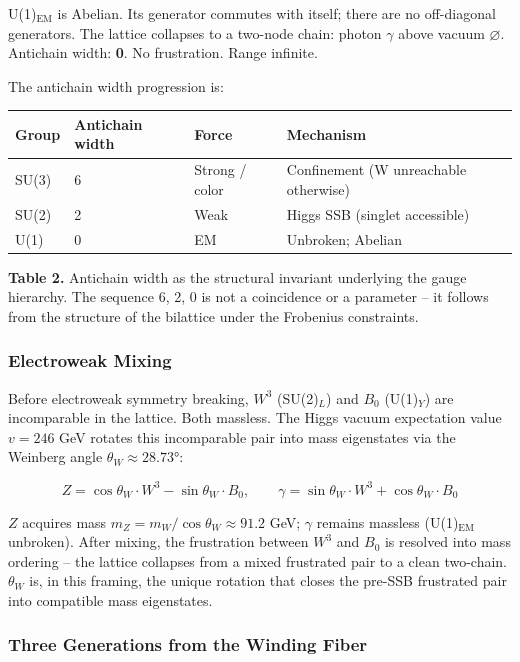 U(1)\(_\text{EM}\) is Abelian. Its generator commutes with itself; there
are no off-diagonal generators. The lattice collapses to a two-node
chain: photon \(\gamma\) above vacuum \(\varnothing\). Antichain width:
\textbf{0}. No frustration. Range infinite.

The antichain width progression is:

\begin{longtable}[]{@{}llll@{}}
\toprule
Group & Antichain width & Force & Mechanism\tabularnewline
\midrule
\endhead
SU(3) & 6 & Strong / color & Confinement (W unreachable
otherwise)\tabularnewline
SU(2) & 2 & Weak & Higgs SSB (singlet accessible)\tabularnewline
U(1) & 0 & EM & Unbroken; Abelian\tabularnewline
\bottomrule
\end{longtable}

\textbf{Table 2.} Antichain width as the structural invariant underlying
the gauge hierarchy. The sequence 6, 2, 0 is not a coincidence or a
parameter -- it follows from the structure of the bilattice under the
Frobenius constraints.

\hypertarget{electroweak-mixing}{%
\subsubsection{Electroweak Mixing}\label{electroweak-mixing}}

Before electroweak symmetry breaking, \(W^3\) (SU(2)\(_L\)) and \(B_0\)
(U(1)\(_Y\)) are incomparable in the lattice. Both massless. The Higgs
vacuum expectation value \(v = 246\) GeV rotates this incomparable pair
into mass eigenstates via the Weinberg angle
\(\theta_W \approx 28.73°\):

\[Z = \cos\theta_W \cdot W^3 - \sin\theta_W \cdot B_0, \qquad
\gamma = \sin\theta_W \cdot W^3 + \cos\theta_W \cdot B_0\]

\(Z\) acquires mass \(m_Z = m_W / \cos\theta_W \approx 91.2\) GeV;
\(\gamma\) remains massless (U(1)\(_\text{EM}\) unbroken). After mixing,
the frustration between \(W^3\) and \(B_0\) is resolved into mass
ordering -- the lattice collapses from a mixed frustrated pair to a
clean two-chain. \(\theta_W\) is, in this framing, the unique rotation
that closes the pre-SSB frustrated pair into compatible mass
eigenstates.

\hypertarget{three-generations-from-the-winding-fiber}{%
\subsubsection{Three Generations from the Winding
Fiber}\label{three-generations-from-the-winding-fiber}}

